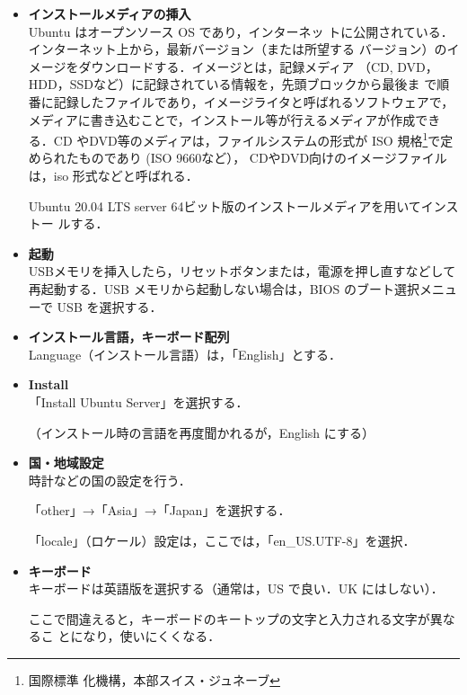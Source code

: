 \begin{itemize}
\item{\bf インストールメディアの挿入} \\
Ubuntu はオープンソース OS であり，インターネッ
トに公開されている．インターネット上から，最新バージョン（または所望する
バージョン）のイメージをダウンロードする．イメージとは，記録メディア
（CD, DVD，HDD，SSDなど）に記録されている情報を，先頭ブロックから最後ま
で順番に記録したファイルであり，イメージライタと呼ばれるソフトウェアで，
メディアに書き込むことで，インストール等が行えるメディアが作成できる．CD 
やDVD等のメディアは，ファイルシステムの形式が ISO 規格\footnote{国際標準
化機構，本部スイス・ジュネーブ}で定められたものであり (ISO 9660など），
CDやDVD向けのイメージファイルは，iso 形式などと呼ばれる．

Ubuntu 20.04 LTS server 64ビット版のインストールメディアを用いてインストー
     ルする．

\item{\bf 起動}\\
USBメモリを挿入したら，リセットボタンまたは，電源を押し直すなどして再起動する．USB メモリから起動しない場合は，BIOS のブート選択メニューで USB を選択する．

\item{\bf インストール言語，キーボード配列}\\

Language（インストール言語）は，「English」とする．

\item{\bf Install}\\

「Install Ubuntu Server」を選択する．

（インストール時の言語を再度聞かれるが，English にする）

\item{\bf 国・地域設定}\\

時計などの国の設定を行う．

「other」→「Asia」→「Japan」を選択する．

「locale」（ロケール）設定は，ここでは，「en\_US.UTF-8」を選択．

\item{\bf キーボード}\\

キーボードは英語版を選択する（通常は，US で良い．UK にはしない）．

ここで間違えると，キーボードのキートップの文字と入力される文字が異なるこ
とになり，使いにくくなる．


\end{itemize}

